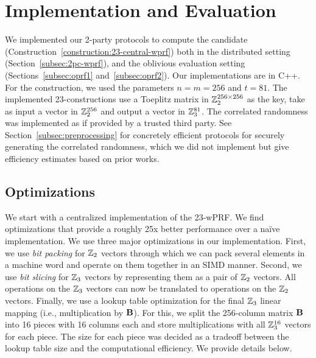 \section{Implementation and Evaluation}
\label{sec:implementation_and_eval}
We implemented our 2-party protocols to compute the \ttwPRF candidate (Construction~\ref{construction:23-central-wprf}) both in the distributed setting (Section~\ref{subsec:2pc-wprf}), and the oblivious evaluation setting (Sections~\ref{subsec:oprf1} and~\ref{subsec:oprf2}). Our implementations are in C++. For the \ttwPRF construction, we used the parameters $n = m = 256$ and $t = 81$. The implemented 23-constructions use a Toeplitz matrix in $\mathbb{Z}_2^{256 \times 256}$ as the key, take as input a vector in $\mathbb{Z}_2^{256}$ and output a vector in $\mathbb{Z}_3^{81}$. The correlated randomness was implemented as if provided by a trusted third party.  See Section~\ref{subsec:preprocessing} for concretely efficient protocols for securely generating the correlated randomness, which we did not implement but give efficiency estimates based on prior works. 

\iffull
\subsection{Optimizations}
\label{subsec:implementation_opt}
We start with a centralized implementation of the 23-wPRF. We find optimizations that provide a roughly 25x better performance over a na\"ive implementation. We use three major optimizations in our implementation. First, we use \textit{bit packing} for $\mathbb{Z}_2$ vectors through which we can pack several elements in a machine word and operate on them together in an SIMD manner. Second, we use \textit{bit slicing} for $\mathbb{Z}_3$ vectors by representing them as a pair of $\mathbb{Z}_2$ vectors. All operations on the $\mathbb{Z}_3$ vectors can now be translated to operations on the $\mathbb{Z}_2$ vectors. Finally, we use a lookup table optimization for the final $\mathbb{Z}_3$ linear mapping (i.e., multiplication by $\mat{B}$). For this, we split the 256-column matrix $\mat{B}$ into 16 pieces with 16 columns each and store multiplications with all $\mathbb{Z}_3^{16}$ vectors for each piece. The size for each piece was decided as a tradeoff between the lookup table size and the computational efficiency. We provide details below.
\else
